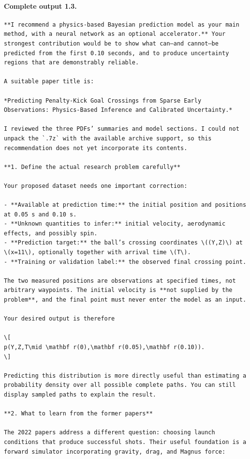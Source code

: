 \documentclass[UTF8,10pt]{ctexart}
\begin{document}
\paragraph{Complete output 1.3.}
\begin{Verbatim}[breaklines=true,breakanywhere=true,fontsize=\scriptsize,frame=single,framesep=2pt]
**I recommend a physics-based Bayesian prediction model as your main method, with a neural network as an optional accelerator.** Your strongest contribution would be to show what can—and cannot—be predicted from the first 0.10 seconds, and to produce uncertainty regions that are demonstrably reliable.

A suitable paper title is:

*Predicting Penalty-Kick Goal Crossings from Sparse Early Observations: Physics-Based Inference and Calibrated Uncertainty.*

I reviewed the three PDFs’ summaries and model sections. I could not unpack the `.7z` with the available archive support, so this recommendation does not yet incorporate its contents.

**1. Define the actual research problem carefully**

Your proposed dataset needs one important correction:

- **Available at prediction time:** the initial position and positions at 0.05 s and 0.10 s.
- **Unknown quantities to infer:** initial velocity, aerodynamic effects, and possibly spin.
- **Prediction target:** the ball’s crossing coordinates \((Y,Z)\) at \(x=11\), optionally together with arrival time \(T\).
- **Training or validation label:** the observed final crossing point.

The two measured positions are observations at specified times, not arbitrary waypoints. The initial velocity is **not supplied by the problem**, and the final point must never enter the model as an input.

Your desired output is therefore

\[
p(Y,Z,T\mid \mathbf r(0),\mathbf r(0.05),\mathbf r(0.10)).
\]

Predicting this distribution is more directly useful than estimating a probability density over all possible complete paths. You can still display sampled paths to explain the result.

**2. What to learn from the former papers**

The 2022 papers address a different question: choosing launch conditions that produce successful shots. Their useful foundation is a forward simulator incorporating gravity, drag, and Magnus force:


\end{Verbatim}
\end{document}

